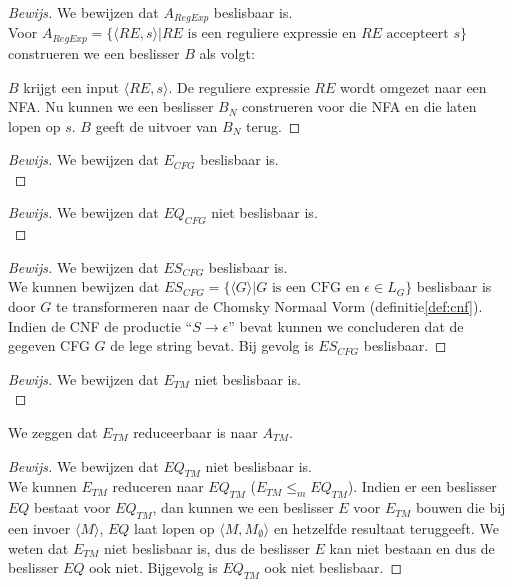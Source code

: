 \documentclass[a4paper]{article}
\newenvironment{bewijs}[1]%
  {\begin{mdframed}[topline=true,
    rightline=true,
    leftline=true,
    bottomline=true]\begin{proof}[Bewijs]#1\\[.2cm]\normalfont}%
  {\end{proof}\end{mdframed}}
\newcommand{\atm}{\ensuremath{{A_{TM}}}}
\newcommand{\etm}{\ensuremath{{E_{TM}}}}
\newcommand{\eqtm}{\ensuremath{{EQ_{TM}}}}
\begin{document}
\begin{bewijs}{We bewijzen dat $A_{RegExp}$ beslisbaar is.}
  Voor $A_{RegExp} = \{\langle RE,s \rangle | RE \text{ is een reguliere expressie en } RE \text{ accepteert } s\}$ construeren we een beslisser $B$ als volgt:
 
 $B$ krijgt een input $\langle RE,s \rangle$. De reguliere expressie $RE$ wordt omgezet naar een NFA. Nu kunnen we een beslisser $B_N$ construeren voor die NFA en die laten lopen op $s$. $B$ geeft de uitvoer van $B_N$ terug.
\end{bewijs}


\begin{bewijs}{We bewijzen dat $E_{CFG}$ beslisbaar is.}
  
\end{bewijs}

\begin{bewijs}{We bewijzen dat $EQ_{CFG}$ niet beslisbaar is.}
  
\end{bewijs}

\begin{bewijs}{We bewijzen dat $ES_{CFG}$ beslisbaar is.}
  We kunnen bewijzen dat $ES_{CFG} = \{\langle G \rangle | G \text{ is een CFG en } \epsilon \in L_G\}$ beslisbaar is door $G$ te transformeren naar de Chomsky Normaal Vorm (definitie\ref{def:cnf}). Indien de CNF de productie ``$S \rightarrow \epsilon$'' bevat kunnen we concluderen dat de gegeven CFG $G$ de lege string bevat. Bij gevolg is $ES_{CFG}$ beslisbaar.
\end{bewijs}


\begin{bewijs}{We bewijzen dat $\etm$ niet beslisbaar is.}
  
\end{bewijs}
  
We zeggen dat $\etm$ reduceerbaar is naar $\atm$.

\begin{bewijs}{We bewijzen dat $\eqtm$ niet beslisbaar is.}
  We kunnen $\etm$ reduceren naar $\eqtm$ ($\etm \leq_m \eqtm$). Indien er een beslisser $EQ$ bestaat voor $\eqtm$, dan kunnen we een beslisser $E$ voor $\etm$ bouwen die bij een invoer $\langle M \rangle$, $EQ$ laat lopen op $\langle M,M_\emptyset \rangle$ en hetzelfde resultaat teruggeeft. We weten dat $\etm$ niet beslisbaar is, dus de beslisser $E$ kan niet bestaan en dus de beslisser $EQ$ ook niet. Bijgevolg is $\eqtm$ ook niet beslisbaar.
\end{bewijs}
\end{document}

